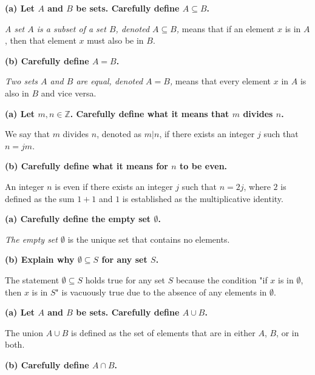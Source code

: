 
\textbf{(a) Let \( A \) and \( B \) be sets. Carefully define \( A \subseteq B \).}

\textit{A set \( A \) is a subset of a set \( B \), denoted \( A \subseteq B \),} means that if an element \( x \) is in \( A \), then that element \( x \) must also be in \( B \).

\textbf{(b) Carefully define \( A = B \).}

\textit{Two sets \( A \) and \( B \) are equal, denoted \( A = B \),} means that every element \( x \) in \( A \) is also in \( B \) and vice versa.


\textbf{(a) Let \( m, n \in \mathbb{Z} \). Carefully define what it means that \( m \) divides \( n \).}

We say that \( m \) divides \( n \), denoted as \( m | n \), if there exists an integer \( j \) such that \( n = jm \).

\textbf{(b) Carefully define what it means for \( n \) to be even.}

An integer \( n \) is even if there exists an integer \( j \) such that \( n = 2j \), where \( 2 \) is defined as the sum \( 1 + 1 \) and \( 1 \) is established as the multiplicative identity.


\textbf{(a) Carefully define the empty set \( \emptyset \).}

\textit{The empty set \( \emptyset \)} is the unique set that contains no elements.

\textbf{(b) Explain why \( \emptyset \subseteq S \) for any set \( S \).}

The statement \textit{\( \emptyset \subseteq S \)} holds true for any set \( S \) because the condition "if \( x \) is in \( \emptyset \), then \( x \) is in \( S \)" is vacuously true due to the absence of any elements in \( \emptyset \).


\textbf{(a) Let \( A \) and \( B \) be sets. Carefully define \( A \cup B \).}

The union \( A \cup B \) is defined as the set of elements that are in either \( A \), \( B \), or in both.

\textbf{(b) Carefully define \( A \cap B \).}

